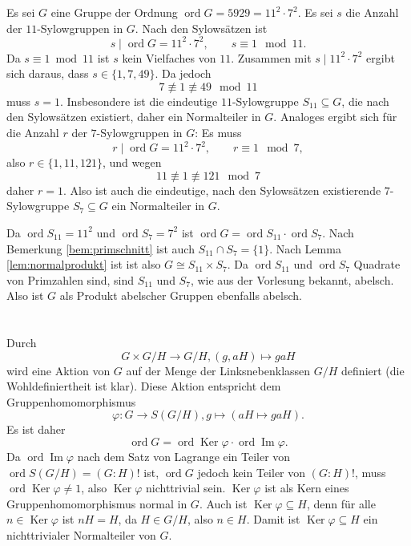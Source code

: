 \documentclass[a4paper,10pt]{article}
\theoremstyle{definition}
\newcommand{\ord}{\operatorname{ord}}
\newcommand{\Img}{\operatorname{Im}}
\newcommand{\Ker}{\operatorname{Ker}}
\begin{document}
Es sei $G$ eine Gruppe der Ordnung $\ord G = 5929 = 11^2 \cdot 7^2$. Es sei $s$ die Anzahl der $11$-Sylowgruppen in $G$. Nach den Sylowsätzen ist
\[
 s \mid \ord G = 11^2 \cdot 7^2, \qquad s \equiv 1 \mod 11.
\]
Da $s \equiv 1 \bmod 11$ ist $s$ kein Vielfaches von $11$. Zusammen mit $s \mid 11^2 \cdot 7^2$ ergibt sich daraus, dass $s \in \{1,7,49\}$. Da jedoch
\[
 7 \not\equiv 1 \not\equiv 49 \mod 11
\]
muss $s = 1$. Insbesondere ist die eindeutige $11$-Sylowgruppe $S_{11} \subseteq G$, die nach den Sylowsätzen existiert, daher ein Normalteiler in $G$.
Analoges ergibt sich für die Anzahl $r$ der $7$-Sylowgruppen in $G$: Es muss
\[
 r \mid \ord G = 11^2 \cdot 7^2, \qquad r \equiv 1 \mod 7,
\]
also $r \in \{1,11,121\}$, und wegen
\[
 11 \not\equiv 1 \not\equiv 121 \mod 7
\]
daher $r = 1$. Also ist auch die eindeutige, nach den Sylowsätzen existierende $7$-Sylowgruppe $S_7 \subseteq G$ ein Normalteiler in $G$.

Da $\ord S_{11} = 11^2$ und $\ord S_7 = 7^2$ ist $\ord G = \ord S_{11} \cdot \ord S_7$. Nach Bemerkung \ref{bem:primschnitt} ist auch $S_{11} \cap S_7 = \{1\}$. Nach Lemma \ref{lem:normalprodukt} ist ist also $G \cong S_{11} \times S_7$. Da $\ord S_{11}$ und $\ord S_7$ Quadrate von Primzahlen sind, sind $S_{11}$ und $S_7$, wie aus der Vorlesung bekannt, abelsch. Also ist $G$ als Produkt abelscher Gruppen ebenfalls abelsch.





\section{}


\subsection{}\label{ssec:fak}
Durch
\[
 G \times G/H \rightarrow G/H, (g,aH) \mapsto gaH
\]
wird eine Aktion von $G$ auf der Menge der Linksnebenklassen $G/H$ definiert (die Wohldefiniertheit ist klar). Diese Aktion entspricht dem Gruppenhomomorphismus
\[
 \varphi : G \rightarrow S(G/H), g \mapsto (aH \mapsto gaH).
\]
Es ist daher
\[
 \ord G
 = \ord \Ker \varphi \cdot \ord \Img \varphi.
\]
Da $\ord \Img \varphi$ nach dem Satz von Lagrange ein Teiler von $
\ord S(G/H) = (G:H)!$ ist, $\ord G$ jedoch kein Teiler von $(G : H)!$, muss $\ord \Ker \varphi \neq 1$, also $\Ker \varphi$ nichttrivial sein. $\Ker \varphi$ ist als Kern eines Gruppenhomomorphismus normal in $G$. Auch ist $\Ker \varphi \subseteq H$, denn für alle $n \in \Ker \varphi$ ist $nH = H$, da $H \in G/H$, also $n \in H$. Damit ist $\Ker \varphi \subseteq H$ ein nichttrivialer Normalteiler von $G$.
\end{document}
